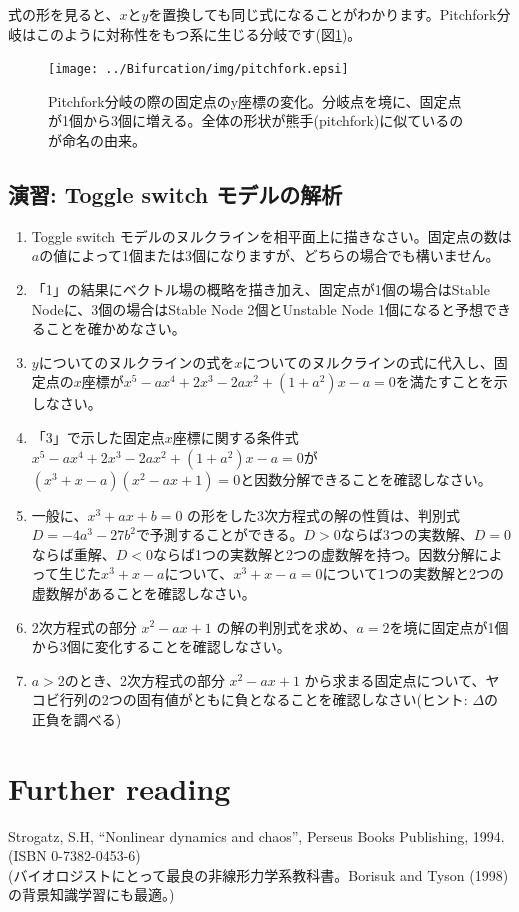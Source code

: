 式の形を見ると、\(x\)と\(y\)を置換しても同じ式になることがわかります。Pitchfork分岐はこのように対称性をもつ系に生じる分岐です(図\ref{fig:12sysbio})。

\begin{figure}[ht]
        \centering \texttt{[image: ../Bifurcation/img/pitchfork.epsi]}
        \caption{Pitchfork分岐の際の固定点のy座標の変化。分岐点を境に、固定点が1個から3個に増える。全体の形状が熊手(pitchfork)に似ているのが命名の由来。}
        \label{fig:12sysbio} \end{figure}


\subsection{演習: Toggle switch モデルの解析}
\begin{enumerate}
\item Toggle switch モデルのヌルクラインを相平面上に描きなさい。固定点の数は\(a\)の値によって1個または3個になりますが、どちらの場合でも構いません。
\item 「1」の結果にベクトル場の概略を描き加え、固定点が1個の場合はStable Nodeに、3個の場合はStable Node 2個とUnstable Node 1個になると予想できることを確かめなさい。
\item \(y\)についてのヌルクラインの式を\(x\)についてのヌルクラインの式に代入し、固定点の\(x\)座標が\(x^5-ax^4+2x^3-2ax^2+(1+a^2)x-a=0\)を満たすことを示しなさい。
\item 「3」で示した固定点\(x\)座標に関する条件式\(x^5-ax^4+2x^3-2ax^2+(1+a^2)x-a=0\)が\((x^3+x-a)(x^2-ax+1)=0\)と因数分解できることを確認しなさい。
\item 一般に、\(x^3+ax+b=0\) の形をした3次方程式の解の性質は、判別式\(D=-4a^3-27b^2\)で予測することができる。\(D>0\)ならば3つの実数解、\(D=0\)ならば重解、\(D<0\)ならば1つの実数解と2つの虚数解を持つ。因数分解によって生じた\(x^3+x-a\)について、\(x^3+x-a=0\)について1つの実数解と2つの虚数解があることを確認しなさい。
\item 2次方程式の部分 \(x^2-ax+1\) の解の判別式を求め、\(a=2\)を境に固定点が1個から3個に変化することを確認しなさい。
\item \(a>2\)のとき、2次方程式の部分 \(x^2-ax+1\) から求まる固定点について、ヤコビ行列の2つの固有値がともに負となることを確認しなさい(ヒント: \(\Delta\)の正負を調べる)
\end{enumerate}

\section{Further reading}
\noindent Strogatz, S.H, “Nonlinear dynamics and chaos”, Perseus Books Publishing, 1994. (ISBN 0-7382-0453-6)\\
(バイオロジストにとって最良の非線形力学系教科書。Borisuk and Tyson (1998)の背景知識学習にも最適。)\\

